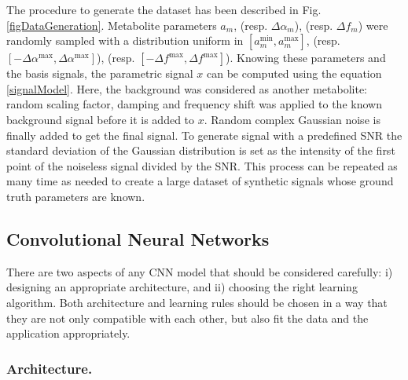 \documentclass{llncs}
\begin{document}
The procedure to generate the dataset has been described in Fig. \ref{figDataGeneration}.
Metabolite parameters $a_m$, (resp. $\Delta \alpha_m$), (resp. $\Delta f_m$)
were randomly sampled with a distribution uniform in $[a_m^\text{min},a_m^\text{max}]$, 
(resp. $[-\Delta \alpha^\text{max},\Delta \alpha^\text{max}]$), 
(resp. $[-\Delta f^\text{max},\Delta f^\text{max}]$).
Knowing these parameters and the basis signals, the parametric signal $x$ can be computed using the equation \ref{signalModel}.
Here, the background was considered as another metabolite: random scaling factor, damping and frequency shift was
applied to the known background signal before it is added to $x$.
Random complex Gaussian noise is finally added to get the final signal.
To generate signal with a predefined SNR the standard deviation of the Gaussian distribution is set as the intensity of the first point of the noiseless signal
divided by the SNR.
This process can be repeated as many time as needed to create a large dataset of synthetic signals whose ground truth parameters are known.




\subsection{Convolutional Neural Networks}

There are two aspects of any CNN model that should be considered carefully: i) designing an appropriate architecture, and ii) choosing the right learning algorithm.  Both architecture and learning rules should be chosen in a way that they are not only compatible with each other, but also fit the data and the application
appropriately. 

\subsubsection{Architecture.}
\end{document}
